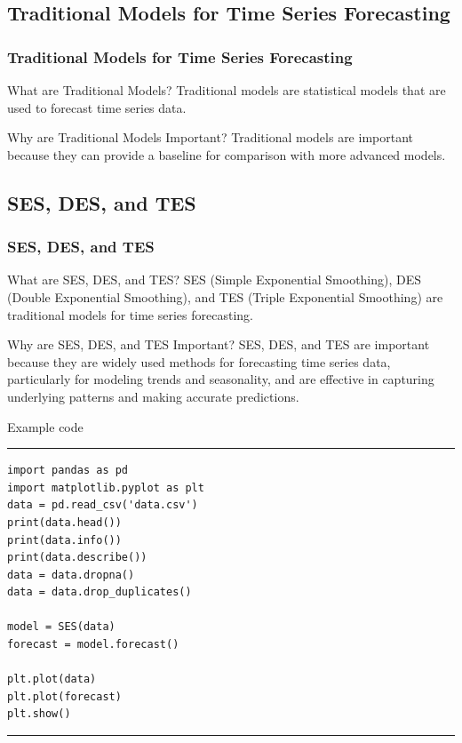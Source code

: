 \documentclass[aspectratio=169, hideothersubsections]{beamer}
\begin{document}
\subsection{Traditional Models for Time Series Forecasting}

\begin{frame}
  \frametitle{Traditional Models for Time Series Forecasting}
  \begin{block}{What are Traditional Models?}
    Traditional models are statistical models that are used to forecast time series data.
  \end{block}
  \begin{block}{Why are Traditional Models Important?}
    Traditional models are important because they can provide a baseline for comparison with more advanced models.
  \end{block}
\end{frame}

\subsection{SES, DES, and TES}

\begin{frame}
  \frametitle{SES, DES, and TES}
  \begin{block}{What are SES, DES, and TES?}
    SES (Simple Exponential Smoothing), DES (Double Exponential Smoothing), and TES (Triple Exponential Smoothing) are traditional models for time series forecasting.
  \end{block}
  \begin{block}{Why are SES, DES, and TES Important?}
   SES, DES, and TES are important because they are widely used methods for forecasting time series data, particularly for modeling trends and seasonality, and are effective in capturing underlying patterns and making accurate predictions.
  \end{block}
\end{frame}

\begin{frame}[fragile]{Example code}
\rule{\textwidth}{1pt}
\scriptsize
\begin{verbatim}
import pandas as pd
import matplotlib.pyplot as plt
data = pd.read_csv('data.csv')
print(data.head())
print(data.info())
print(data.describe())
data = data.dropna()
data = data.drop_duplicates()

model = SES(data)
forecast = model.forecast()

plt.plot(data)
plt.plot(forecast)
plt.show()
\end{verbatim}
\rule{\textwidth}{1pt}
\end{frame}
\end{document}

